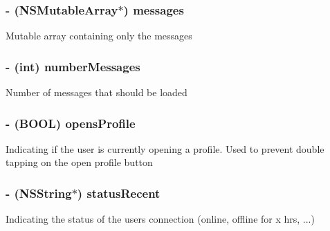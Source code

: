 \subsubsection[{messages}]{\setlength{\rightskip}{0pt plus 5cm}-\/ (N\+S\+Mutable\+Array$\ast$) messages\hspace{0.3cm}{\ttfamily [protected]}}\label{category_e_s_chat_view_07_08_a5022765b26e43b5f9fcdfa24a794c3c2}
Mutable array containing only the messages \hypertarget{category_e_s_chat_view_07_08_a9da0d4e81f3bb115c96dbd4e9949f5fd}{}
\subsubsection[{number\+Messages}]{\setlength{\rightskip}{0pt plus 5cm}-\/ (int) number\+Messages\hspace{0.3cm}{\ttfamily [protected]}}\label{category_e_s_chat_view_07_08_a9da0d4e81f3bb115c96dbd4e9949f5fd}
Number of messages that should be loaded \hypertarget{category_e_s_chat_view_07_08_a9e82734ea3b435b31c1c09d15faa258a}{}
\subsubsection[{opens\+Profile}]{\setlength{\rightskip}{0pt plus 5cm}-\/ (B\+O\+O\+L) opens\+Profile\hspace{0.3cm}{\ttfamily [protected]}}\label{category_e_s_chat_view_07_08_a9e82734ea3b435b31c1c09d15faa258a}
Indicating if the user is currently opening a profile. Used to prevent double tapping on the open profile button \hypertarget{category_e_s_chat_view_07_08_a91e1427c529ea59b135dda286c773acb}{}
\subsubsection[{status\+Recent}]{\setlength{\rightskip}{0pt plus 5cm}-\/ (N\+S\+String$\ast$) status\+Recent\hspace{0.3cm}{\ttfamily [protected]}}\label{category_e_s_chat_view_07_08_a91e1427c529ea59b135dda286c773acb}
Indicating the status of the user\textquotesingle{}s connection (online, offline for x hrs, ...) \hypertarget{category_e_s_chat_view_07_08_ab8d88592b083ac2957b18ab953fc2c31}{}
